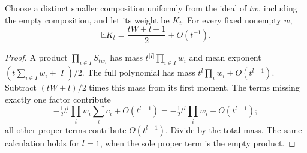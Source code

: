 \begin{corollary}\label{cor:dilationmean}
Choose a distinct smaller composition uniformly from the ideal of
$tw$, including the empty composition, and let its weight be $K_t$.
For every fixed nonempty $w$,
\[
 \mathbb E K_t=\frac{tW+l-1}{2}+O(t^{-1}).
\]
\end{corollary}
\begin{proof}
A product $\prod_{i\in I}S_{tw_i}$ has mass
$t^{|I|}\prod_{i\in I}w_i$ and mean exponent
$(t\sum_{i\in I}w_i+|I|)/2$. The full polynomial has mass
$t^l\prod_iw_i+O(t^{l-1})$.
Subtract $(tW+l)/2$ times this mass from its first moment.
The terms missing exactly one factor contribute
\[
 -\tfrac12t^l\prod_iw_i\sum_i c_i+O(t^{l-1})
 =-\tfrac12t^l\prod_iw_i+O(t^{l-1});
\]
all other proper terms contribute $O(t^{l-1})$.
Divide by the total mass. The same calculation holds for $l=1$,
when the sole proper term is the empty product.
\end{proof}
